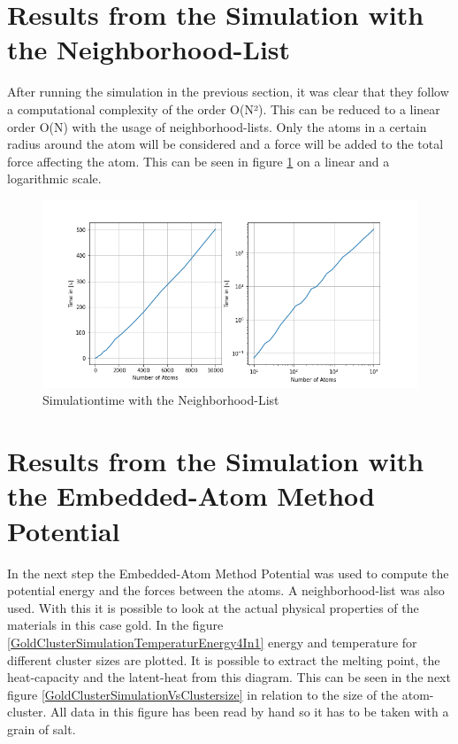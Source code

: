 \section{Results from the Simulation with the Neighborhood-List}

After running the simulation in the previous section, it was clear that they follow a computational complexity of the order O(N²). This can be reduced to a linear order O(N) with the usage of neighborhood-lists. Only the atoms in a certain radius around the atom will be considered and a force will be added to the total force affecting the atom. This can be seen in figure \ref{PlotSimulationTimesCutoffNew} on a linear and a logarithmic scale.  
\begin{figure}
	\begin{center}
		\includegraphics[scale=1.25]{Figure/plotAtomTimesMoreData.png}
	\end{center}
	\caption[Simulationtime with the Neighborhood-List]{Simulationtime with the Neighborhood-List}
	\label{PlotSimulationTimesCutoffNew}
\end{figure}

\section{Results from the Simulation with the Embedded-Atom Method Potential}

In the next step the Embedded-Atom Method Potential was used to compute the potential energy and the forces between the atoms. A neighborhood-list was also used. With this it is possible to look at the actual physical properties of the materials in this case gold. In the figure \ref{GoldClusterSimulationTemperaturEnergy4In1} energy and temperature for different cluster sizes are plotted. It is possible to extract the melting point, the heat-capacity and the latent-heat from this diagram. This can be seen in the next figure \ref{GoldClusterSimulationVsClustersize} in relation to the size of the atom-cluster. All data in this figure has been read by hand so it has to be taken with a grain of salt. 

